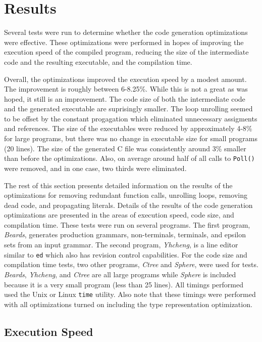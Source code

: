 \section{Results}

Several tests were run to determine whether the code generation
optimizations were effective. These optimizations were performed in
hopes of improving the execution speed of the compiled program,
reducing the size of the intermediate code and the resulting
executable, and the compilation time.

Overall, the optimizations improved the execution speed by a modest
amount. The improvement is roughly between 6-8.25\%.  While this is
not a great as was hoped, it still is an improvement. The code size of
both the intermediate code and the generated executable are
suprisingly smaller. The loop unrolling seemed to be offset by the
constant progagation which eliminated unnecessary assigments and
references. The size of the executables were reduced by approximately
4-8\% for large programs, but there was no change in executable size
for small programs (20 lines). The size of the generated C file was
consistently around 3\% smaller than before the optimizations.
Also, on average around half of all calls to \texttt{Poll()} were
removed, and in one case, two thirds were eliminated.

The rest of this section presents detailed information on the results of the
optimizations for removing redundant function calls, unrolling loops,
removing dead code, and propagating literals.  Details of the results
of the code generation optimizations are presented in the areas of
execution speed, code size, and compilation time. These tests were run
on several programs. The first program, \textit{Beards}, generates
production grammars, non-terminals, terminals, and epsilon sets from
an input grammar. The second program, \textit{Yhcheng}, is a line
editor similar to \texttt{ed} which also has revision control
capabilities. For the code size and compilation time tests, two other
programs, \textit{Ctree} and \textit{Sphere}, were used for
tests. \textit{Beards}, \textit{Yhcheng}, and \textit{Ctree} are all
large programs while \textit{Sphere} is included because it is a very
small program (less than 25 lines).  All timings performed used the
Unix or Linux \texttt{time} utility.  Also note that these timings
were performed with all optimizations turned on including the type
representation optimization.

\subsection{Execution Speed}

